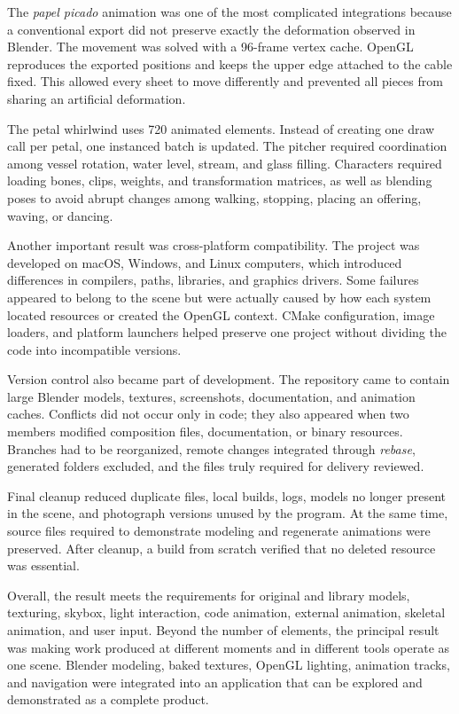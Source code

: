 \documentclass[letter,12pt]{article}
\begin{document}
	The \textit{papel picado} animation was one of the most complicated integrations because a conventional export did not preserve exactly the deformation observed in Blender. The movement was solved with a 96-frame vertex cache. OpenGL reproduces the exported positions and keeps the upper edge attached to the cable fixed. This allowed every sheet to move differently and prevented all pieces from sharing an artificial deformation.

	The petal whirlwind uses 720 animated elements. Instead of creating one draw call per petal, one instanced batch is updated. The pitcher required coordination among vessel rotation, water level, stream, and glass filling. Characters required loading bones, clips, weights, and transformation matrices, as well as blending poses to avoid abrupt changes among walking, stopping, placing an offering, waving, or dancing.

	Another important result was cross-platform compatibility. The project was developed on macOS, Windows, and Linux computers, which introduced differences in compilers, paths, libraries, and graphics drivers. Some failures appeared to belong to the scene but were actually caused by how each system located resources or created the OpenGL context. CMake configuration, image loaders, and platform launchers helped preserve one project without dividing the code into incompatible versions.

	Version control also became part of development. The repository came to contain large Blender models, textures, screenshots, documentation, and animation caches. Conflicts did not occur only in code; they also appeared when two members modified composition files, documentation, or binary resources. Branches had to be reorganized, remote changes integrated through \textit{rebase}, generated folders excluded, and the files truly required for delivery reviewed.

	Final cleanup reduced duplicate files, local builds, logs, models no longer present in the scene, and photograph versions unused by the program. At the same time, source files required to demonstrate modeling and regenerate animations were preserved. After cleanup, a build from scratch verified that no deleted resource was essential.

	Overall, the result meets the requirements for original and library models, texturing, skybox, light interaction, code animation, external animation, skeletal animation, and user input. Beyond the number of elements, the principal result was making work produced at different moments and in different tools operate as one scene. Blender modeling, baked textures, OpenGL lighting, animation tracks, and navigation were integrated into an application that can be explored and demonstrated as a complete product.
\end{document}
